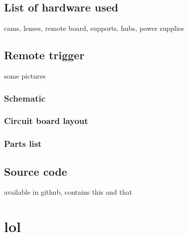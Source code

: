 \section{List of hardware used}

cams, lenses, remote board, supports, hubs, power supplies

\section{Remote trigger}

some pictures

\subsection{Schematic}

\subsection{Circuit board layout}

\subsection{Parts list}

\section{Source code}

available in github, contains this and that

\chapter{lol}
